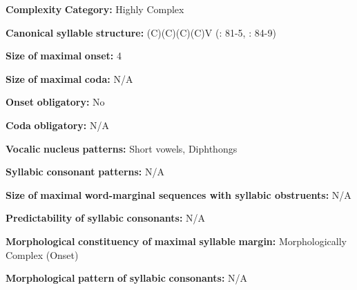\documentclass[output=paper]{langsci/langscibook}
\begin{document}
\begin{styleBody}
\textbf{Complexity} \textbf{Category:} Highly Complex
\end{styleBody}

\begin{styleBody}
\textbf{Canonical} \textbf{syllable} \textbf{structure:} (C)(C)(C)(C)V (\citealt{Howard1967}: 81-5, \citealt{Howard1972}: 84-9)
\end{styleBody}

\begin{styleBody}
\textbf{Size} \textbf{of} \textbf{maximal} \textbf{onset:} 4
\end{styleBody}

\begin{styleBody}
\textbf{Size} \textbf{of} \textbf{maximal} \textbf{coda:} N/A
\end{styleBody}

\begin{styleBody}
\textbf{Onset} \textbf{obligatory:} No
\end{styleBody}

\begin{styleBody}
\textbf{Coda} \textbf{obligatory:} N/A
\end{styleBody}

\begin{styleBody}
\textbf{Vocalic} \textbf{nucleus} \textbf{patterns:} Short vowels, Diphthongs
\end{styleBody}

\begin{styleBody}
\textbf{Syllabic} \textbf{consonant} \textbf{patterns:} N/A
\end{styleBody}

\begin{styleBody}
\textbf{Size} \textbf{of} \textbf{maximal} \textbf{word{}-marginal sequences with syllabic obstruents:} N/A
\end{styleBody}

\begin{styleBody}
\textbf{Predictability} \textbf{of} \textbf{syllabic} \textbf{consonants:} N/A
\end{styleBody}

\begin{styleBody}
\textbf{Morphological} \textbf{constituency} \textbf{of} \textbf{maximal} \textbf{syllable} \textbf{margin:} Morphologically Complex (Onset)
\end{styleBody}

\begin{styleBody}
\textbf{Morphological} \textbf{pattern} \textbf{of} \textbf{syllabic} \textbf{consonants:} N/A
\end{styleBody}
\end{document}
